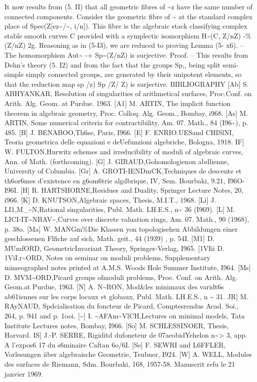 \documentclass[11pt]{article}
\theoremstyle{plain}
\theoremstyle{definition}
\theoremstyle{remark}
\begin{document}
It now results from (5. II) that all geometric fibres of \textasciitilde{}z have the same number of connected components. Consider the geometric fibre of \textasciitilde{} at the standard complex place of Spec(Z[ez\textasciitilde{}/\textasciitilde{}, i/n]). This fibre is the algebraic stack classifying complex stable smooth curves C provided with a symplectic isomorphism H\textasciitilde{}(C, Z/nZ) -\% (Z/nZ) 2g. Reasoning as in (5-I3), we are reduced to proving Lemma (5- x6). -- The homomorphism Aut\textasciitilde{} -+ Sp\textasciitilde{}(Z/nZ) is surjective. Proof. -- This results from Dehn's theory (5. I2) and from the fact that the groups Sp,, being split semi-simple simply connected groups, are generated by their unipotent elements, so that the reduction map sp /z) Sp /Z/ Z) is surjective. BIBLIOGRAPHY [Ab] S. ABHYANKAR, Resolution of singularities of arithmetical surfaces, Proc.Conf. on Arith. Alg. Geom. at Purdue. 1963. [A1] M. ARTIN, The implicit function theorem in algebraic geometry, Proc. Colloq. Alg. Geom., Bombay, i968. [As] M. ARTIN, Some numerical criteria for contractibility, Am. 07. Math., 84 (I96\textasciitilde{}), p. 485. [B] J. BENABOO,Th6se, Paris, I966. [E] F. ENRIO.UESand CHISlNI, Teoria geometrica delle equazioni e deUefunzioni algebriche, Bologna, 1918. IF] W. FULTON,Hurwitz schemes and irreducibility of moduli of algebraic curves, Ann. of Math. (forthcoming). [G] J. GIRAUD,Gohomologienon abdlienne, University of Columbia. [Gr] A. GROTI-IENDmCK,Techniques de descente et th6or6mes d'existence en g6om6trie algdbrique, IV, Sem. Bourbaki, 9.21, I96O-I96I. [H] R. HARTSHORNE,Residues and Duality, Springer Lecture Notes, 20, i966. [K] D. KNUTSON,Algebraic spaces, Thesis, M.I.T., 1968. [Li] J. LI1,M\_\textasciitilde{}N,Rational singularities, Publ. Math. LH.E.S., n\textasciitilde{} 36 (I969). [L] M. LICI-IT\textasciitilde{}NBAV\textasciitilde{},Curves over discrete valuation rings, Am. 07. Math., 90 (1968), p. 38o. [Ma] W. MANGm\%Die Klassen yon topologisehen Abbildungen einer geschlossenen Flfiche auf sich, Math. geit., 44 (1939) , p. 54I. [M1] D. MUmfORD, GeometricInvariant Theory, Springer-Verlag, I965. [1VIii D. 1ViI.r\textasciitilde{}ORD, Notes on seminar on moduli problems, Supplementary mimeographed notes printed at A.M.S. Woods Hole Summer Institute, I964. [Ms] D. MVM\textasciitilde{}ORD,Picard groups ofmoduli problems, Proe. Conf. on Arith. Alg. Geom.at Purdue, 1963. [N] A. N\textasciitilde{}RON, Mod\&les minimaux des varidt6s ab61iennes sur les corps locaux et globaux, Publ. Math. LH.E.S., n \textasciitilde{} 31. JR] M. RAyNAUD, Spdcialisation du foncteur de Picard, Comptesrendus Acad. Soi., 264, p. 941 and p. 1ooi. [\textasciitilde{}] I. \textasciitilde{}AFAm\textasciitilde{}VlCH,Lectures on minimal models, Tata Institute Lectures notes, Bombay, I966. [So] M. SCHLESSINOER, Thesis, Harvard. IS] J.-P. SERRE, Rigiditd dufoneteur de 07aeobidYehelon n\textasciitilde{}> 3, app. A l'expos6 17 du s6minaire Caftan 6o/6I. [Se] F. SEWRI and L6FFLER, Vorlesungen iiber algebraische Geometrie, Teubner, I924. [W] A. WELL, Modules des surfaces de Riemann, Sdm. Bourbaki, 168, 1957-58. Manuscrit refu le 21 janvier 1969.
\end{document}
